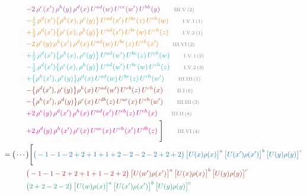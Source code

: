 \documentclass[10pt]{article}
\begin{document}
\begin{align}
&\qquad{\color{DarkOrchid}-2\,\rho^{e}(x')\,\rho^{h}(y)\,\rho^{d}(x)\,U^{ad}(w)\,U^{ce}(w')\,U^{bh}(y)}\tag*{\color{gray}\scriptsize III.V\,(2)}\\
&\qquad{\color{BurntOrange}-\tfrac{1}{2}\,\rho^{d}(x')\big\{\rho^{h}(x),\rho^{e}(y)\big\}\,U^{ad}(x')\,U^{be}(z)\,U^{ch}(w)}\tag*{\color{gray}\scriptsize I.V.1\,(1)}\\
&\qquad{\color{BurntOrange}+\tfrac{1}{2}\,\rho^{d}(x')\big\{\rho^{e}(x),\rho^{h}(y)\big\}\,U^{ad}(x')\,U^{be}(w)\,U^{ch}(z)}\tag*{\color{gray}\scriptsize I.V.2\,(1)}\\
&\qquad{\color{BurntOrange}-2\,\rho^{e}(y)\,\rho^{h}(x')\,\rho^{d}(x)\,U^{ad}(w)\,U^{be}(z)\,U^{ch}(x')}\tag*{\color{gray}\scriptsize III.VI\,(2)}\\
&\qquad{\color{TealBlue}+\tfrac{1}{2}\,\rho^{d}(x')\big\{\rho^{h}(x),\rho^{e}(y)\big\}\,U^{ad}(w')\,U^{be}(z)\,U^{ch}(w)}\tag*{\color{gray}\scriptsize I.V.1\,(2)}\\
&\qquad{\color{TealBlue}-\tfrac{1}{2}\,\rho^{d}(x')\big\{\rho^{e}(x),\rho^{h}(y)\big\}\,U^{ad}(w')\,U^{be}(w)\,U^{ch}(z)}\tag*{\color{gray}\scriptsize I.V.2\,(3)}\\
&\qquad{\color{TealBlue}+\big\{\rho^{h}(x'),\rho^{e}(y)\big\}\rho^{d}(x)\,U^{ad}(w)\,U^{be}(z)\,U^{ch}(w')}\tag*{\color{gray}\scriptsize III.III\,(1)}\\
&\qquad{\color{Mahogany}-\big\{\rho^{d}(x'),\rho^{e}(y)\big\}\rho^{h}(x)\,U^{ad}(w')\,U^{eb}(z)\,U^{ch}(x)}\tag*{\color{gray}\scriptsize II.I\,(6)}\\
&\qquad{\color{Mahogany}-\big\{\rho^{h}(x'),\rho^{d}(y)\big\}\rho^{e}(x)\,U^{db}(z)\,U^{ae}(x)\,U^{ch}(w')}\tag*{\color{gray}\scriptsize III.III\,(3)}\\
&\qquad{\color{Magenta}+2\,\rho^{e}(y)\,\rho^{d}(x')\, \rho^{h}(x)\, U^{ad}(x')\,U^{eb}(z)\,U^{ch}(x)}\tag*{\color{gray}\scriptsize III.II\,(8)}\\
&\qquad{\color{Magenta}+2\,\rho^{d}(y)\,\rho^{h}(x')\,\rho^{e}(x)\,U^{ae}(x)\,U^{ch}(x')\,U^{db}(z)}\;\Bigg]\tag*{\color{gray}\scriptsize III.VI\,(4)}\\
={}&\big(\cdots\big)\Bigg[{\color{RoyalBlue}\big(-1-1-2+2+1+1+2-2-2-2+2+2\big)\,\big[U(x)\rho(x)\big]^{a}\,\big[U(x')\rho(x')\big]^{b}\,\big[U(y)\rho(y)\big]^{c}}\notag\\
&\qquad{\color{BrickRed}\big(-1-1-2+2+1+1-2+2\big)\,\big[U(w')\rho(x')\big]^{a}\,\big[U(x)\rho(x)\big]^{b}\,\big[U(y)\rho(y)\big]^{c}}\notag\\
&\qquad{\color{ForestGreen}\big(2+2-2-2\big)\,\big[U(w)\rho(x)\big]^{a}\,\big[U(x')\rho(x')\big]^{b}\,\big[U(y)\rho(y)\big]^{c}}\notag\\

\end{align}
\end{document}
